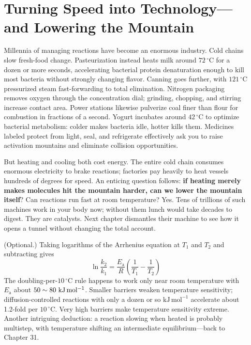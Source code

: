 \section{Turning Speed into Technology---and Lowering the Mountain}

Millennia of managing reactions have become an enormous industry. Cold chains slow fresh-food change. Pasteurization instead heats milk around $72\,^{\circ}\mathrm{C}$ for a dozen or more seconds, accelerating bacterial protein denaturation enough to kill most bacteria without strongly changing flavor. Canning goes further, with $121\,^{\circ}\mathrm{C}$ pressurized steam fast-forwarding to total elimination. Nitrogen packaging removes oxygen through the concentration dial; grinding, chopping, and stirring increase contact area. Power stations likewise pulverize coal finer than flour for combustion in fractions of a second. Yogurt incubates around $42\,^{\circ}\mathrm{C}$ to optimize bacterial metabolism: colder makes bacteria idle, hotter kills them. Medicines labeled protect from light, seal, and refrigerate effectively ask you to raise activation mountains and eliminate collision opportunities.

But heating and cooling both cost energy. The entire cold chain consumes enormous electricity to brake reactions; factories pay heavily to heat vessels hundreds of degrees for speed. An enticing question follows: \textbf{if heating merely makes molecules hit the mountain harder, can we lower the mountain itself}? Can reactions run fast at room temperature? Yes. Tens of trillions of such machines work in your body now; without them lunch would take decades to digest. They are catalysts. Next chapter dismantles their machine to see how it opens a tunnel without changing the total account.

\begin{tiaozhan}
(Optional.) Taking logarithms of the Arrhenius equation at $T_1$ and $T_2$ and subtracting gives
\[\ln\frac{k_2}{k_1} = \frac{E_{\mathrm{a}}}{R}\left(\frac{1}{T_1}-\frac{1}{T_2}\right)\]
The doubling-per-$10\,^{\circ}\mathrm{C}$ rule happens to work only near room temperature with $E_{\mathrm{a}}$ about $50\sim80\ \mathrm{kJ\,mol^{-1}}$. Smaller barriers weaken temperature sensitivity; diffusion-controlled reactions with only a dozen or so $\mathrm{kJ\,mol^{-1}}$ accelerate about 1.2-fold per $10\,^{\circ}\mathrm{C}$. Very high barriers make temperature sensitivity extreme. Another intriguing deduction: a reaction slowing when heated is probably multistep, with temperature shifting an intermediate equilibrium---back to Chapter 31.
\end{tiaozhan}

